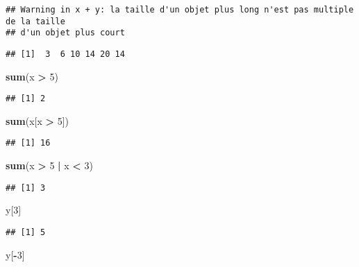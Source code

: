 \documentclass[]{article}
\newenvironment{Shaded}{\begin{snugshade}}{\end{snugshade}}
\newcommand{\DecValTok}[1]{\textcolor[rgb]{0.00,0.00,0.81}{#1}}
\newcommand{\KeywordTok}[1]{\textcolor[rgb]{0.13,0.29,0.53}{\textbf{#1}}}
\newcommand{\NormalTok}[1]{#1}
\newcommand{\OperatorTok}[1]{\textcolor[rgb]{0.81,0.36,0.00}{\textbf{#1}}}
\newcommand{\StringTok}[1]{\textcolor[rgb]{0.31,0.60,0.02}{#1}}
\begin{document}
\begin{verbatim}
## Warning in x + y: la taille d'un objet plus long n'est pas multiple de la taille
## d'un objet plus court
\end{verbatim}

\begin{verbatim}
## [1]  3  6 10 14 20 14
\end{verbatim}

\begin{Shaded}
\begin{Highlighting}[]
\KeywordTok{sum}\NormalTok{(x }\OperatorTok{>}\StringTok{ }\DecValTok{5}\NormalTok{)}
\end{Highlighting}
\end{Shaded}

\begin{verbatim}
## [1] 2
\end{verbatim}

\begin{Shaded}
\begin{Highlighting}[]
\KeywordTok{sum}\NormalTok{(x[x }\OperatorTok{>}\StringTok{ }\DecValTok{5}\NormalTok{])}
\end{Highlighting}
\end{Shaded}

\begin{verbatim}
## [1] 16
\end{verbatim}

\begin{Shaded}
\begin{Highlighting}[]
\KeywordTok{sum}\NormalTok{(x }\OperatorTok{>}\StringTok{ }\DecValTok{5} \OperatorTok{|}\StringTok{ }\NormalTok{x }\OperatorTok{<}\StringTok{ }\DecValTok{3}\NormalTok{) }
\end{Highlighting}
\end{Shaded}

\begin{verbatim}
## [1] 3
\end{verbatim}

\begin{Shaded}
\begin{Highlighting}[]
\NormalTok{y[}\DecValTok{3}\NormalTok{] }
\end{Highlighting}
\end{Shaded}

\begin{verbatim}
## [1] 5
\end{verbatim}

\begin{Shaded}
\begin{Highlighting}[]
\NormalTok{y[}\OperatorTok{-}\DecValTok{3}\NormalTok{]}
\end{Highlighting}
\end{Shaded}
\end{document}
